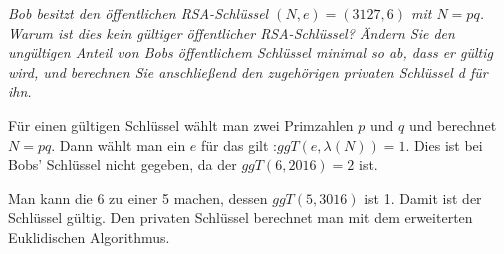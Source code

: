 \documentclass[
  ngerman,
  DIV=12
]{scrartcl}
\begin{document}
\emph{Bob besitzt den öffentlichen RSA-Schlüssel $(N, e) = (3127, 6)$ mit $N = pq$.
Warum ist dies kein gültiger öffentlicher RSA-Schlüssel? Ändern Sie den ungültigen Anteil von Bobs öffentlichem Schlüssel minimal so ab, dass er gültig wird, und berechnen Sie anschließend den zugehörigen privaten Schlüssel d für ihn.}

Für einen gültigen Schlüssel wählt man zwei Primzahlen $p$ und $q$ und berechnet $N = pq$. Dann wählt man ein $e$ für das gilt :$ggT(e, \lambda(N)) = 1$. Dies ist bei Bobs' Schlüssel nicht gegeben, da der $ggT(6, 2016) = 2$ ist. 

Man kann die 6 zu einer 5 machen, dessen $ggT(5, 3016)$ ist 1. Damit ist der Schlüssel gültig. Den privaten Schlüssel berechnet man mit dem erweiterten Euklidischen Algorithmus.
\end{document}
